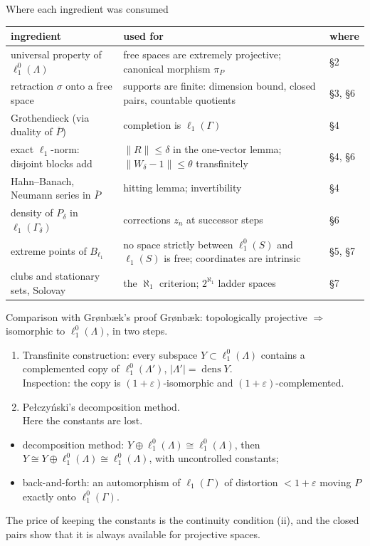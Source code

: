 \documentclass[10pt,aspectratio=169]{beamer}
\newcommand{\lo}[1]{\ell_1^0(#1)}
\newcommand{\ellone}[1]{\ell_1(#1)}
\newcommand{\dens}{\operatorname{dens}}
\begin{document}
\begin{frame}{Where each ingredient was consumed}
  \small
  \renewcommand{\arraystretch}{1.3}
  \begin{tabular}{@{}p{}p{}p{}@{}}
    \toprule
    ingredient & used for & where\\
    \midrule
    universal property of $\lo\Lambda$ & free spaces are extremely projective;
      canonical morphism $\pi_P$ & \S2\\
    retraction $\sigma$ onto a free space & supports are finite: dimension bound,
      closed pairs, countable quotients & \S3, \S6\\
    Grothendieck (via duality of $\overline P$) & completion is $\ellone\Gamma$ & \S4\\
    exact $\ell_1$-norm: disjoint blocks add & $\|R\|\le\delta$ in the one-vector lemma;
      $\|W_\delta-1\|\le\theta$ transfinitely & \S4, \S6\\
    Hahn--Banach, Neumann series in $\overline P$ & hitting lemma; invertibility & \S4\\
    density of $P_\delta$ in $\ellone{\Gamma_\delta}$ & corrections $z_n$ at
      successor steps & \S6\\
    extreme points of $B_{\ell_1}$ & no space strictly between $\lo S$ and $\ellone S$ is free;
      coordinates are intrinsic & \S5, \S7\\
    clubs and stationary sets, Solovay & the $\aleph_1$ criterion; $2^{\aleph_1}$ ladder spaces & \S7\\
    \bottomrule
  \end{tabular}
\end{frame}

\begin{frame}{Comparison with Gr{\o}nb{\ae}k's proof}
  Gr{\o}nb{\ae}k: topologically projective $\Rightarrow$ isomorphic to $\lo\Lambda$, in two steps.
  \begin{enumerate}
    \item Transfinite construction: every subspace $Y\subset\lo\Lambda$ contains a
      complemented copy of $\lo{\Lambda'}$, $|\Lambda'|=\dens Y$. \\
      \textcolor{good}{Inspection: the copy is $(1+\varepsilon)$-isomorphic and
      $(1+\varepsilon)$-complemented.}
    \item Pe{\l}czy\'nski's decomposition method. \\
      \textcolor{accent}{Here the constants are lost.}
  \end{enumerate}
  \medskip
  \begin{itemize}
    \item decomposition method: $Y\oplus\lo\Lambda\cong\lo\Lambda$, then
      $Y\cong Y\oplus\lo\Lambda\cong\lo\Lambda$, with uncontrolled constants;
    \item back-and-forth: an automorphism of $\ellone\Gamma$ of distortion
      $<1+\varepsilon$ moving $P$ exactly onto $\lo\Gamma$.
  \end{itemize}

  The price of keeping the constants is the continuity condition (ii), and the
  closed pairs show that it is always available for projective spaces.
\end{frame}
\end{document}
